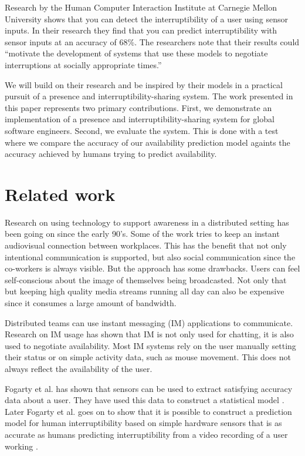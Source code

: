 \documentclass{sigchi}
\begin{document}
Research by the Human Computer Interaction Institute at Carnegie Mellon University \cite{fogarty2005predicting} shows that you can detect the interruptibility of a user using sensor inputs.
In their research they find that you can predict interruptibility with sensor inputs at an accuracy of 68\%.
The researchers note that their results could ``motivate the development of systems that use these models to negotiate interruptions at socially appropriate times.''

We will build on their research and be inspired by their models in a practical pursuit of a presence and interruptibility-sharing system.
The work presented in this paper represents two primary contributions.
First, we demonstrate an implementation of a presence and interruptibility-sharing system for global software engineers.
Second, we evaluate the system.
This is done with a test where we compare the accuracy of our availability prediction model againts the accuracy achieved by humans trying to predict availability.

\section{Related work}
Research on using technology to support awareness in a distributed setting has been going on since the early 90’s.
Some of the work \cite{bly1993media} \cite{gaver1992realizing} \cite{mantei1991experiences} tries to keep an instant audiovisual connection between workplaces.
This has the benefit that not only intentional communication is supported, but also social communication since the co-workers is always visible.
But the approach has some drawbacks.
Users can feel self-conscious about the image of themselves being broadcasted.
Not only that but keeping high quality media streams running all day can also be expensive since it consumes a large amount of bandwidth.

Distributed teams can use instant messaging (IM) applications to communicate.
Research on IM usage \cite{nardi2000interaction} \cite{handel2002chat} \cite{tang2001connexus} has shown that IM is not only used for chatting, it is also used to negotiate availability.
Most IM systems rely on the user manually setting their status or on simple activity data, such as mouse movement.
This does not always reflect the availability of the user.

Fogarty et al. has shown that sensors can be used to extract satisfying accuracy data about a user.
They have used this data to construct a statistical model \cite{fogarty2004examining}.
Later Fogarty et al. goes on to show that it is possible to construct a prediction model for human interruptibility based on simple hardware sensors that is as accurate as humans predicting interruptibility from a video recording of a user working \cite{fogarty2005predicting}.
\end{document}
